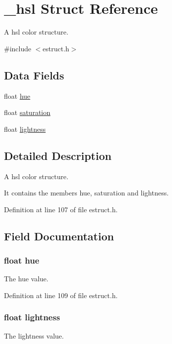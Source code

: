 \hypertarget{struct__hsl}{\section{\-\_\-hsl Struct Reference}
\label{struct__hsl}
}


A hsl color structure.  




{\ttfamily \#include $<$estruct.\-h$>$}

\subsection*{Data Fields}
\begin{DoxyCompactItemize}
\item 
float \hyperlink{struct__hsl_a408d4a7316413ec687c945201a907e98}{hue}
\item 
float \hyperlink{struct__hsl_a953351912fb6da22fde59fe0f24909e7}{saturation}
\item 
float \hyperlink{struct__hsl_a9a22c1947d9e158ae5d791807fae36ed}{lightness}
\end{DoxyCompactItemize}


\subsection{Detailed Description}
A hsl color structure. 

It contains the members hue, saturation and lightness. 

Definition at line 107 of file estruct.\-h.



\subsection{Field Documentation}
\hypertarget{struct__hsl_a408d4a7316413ec687c945201a907e98}{
\subsubsection[{hue}]{\setlength{\rightskip}{0pt plus 5cm}float hue}}\label{struct__hsl_a408d4a7316413ec687c945201a907e98}
The hue value. 

Definition at line 109 of file estruct.\-h.

\hypertarget{struct__hsl_a9a22c1947d9e158ae5d791807fae36ed}{
\subsubsection[{lightness}]{\setlength{\rightskip}{0pt plus 5cm}float lightness}}\label{struct__hsl_a9a22c1947d9e158ae5d791807fae36ed}
The lightness value. 


